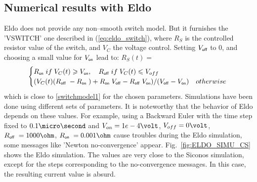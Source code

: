 \subsection{Numerical results with {\sc Eldo}}
{\sc Eldo} does not provide any non--smooth switch model. But it furnishes the 'VSWITCH' one described in
(\ref{eq:eldo_switch}), where  $R_S$ is the controlled resistor value of the switch, and $V_{C}$ the voltage
control. Setting $V_{\off}$ to $0$, and choosing a small value for $V_{\on}$ lead to: $R_S(t)=$
 \begin{equation}
    \label{eq:eldo_switch}
\begin{cases}R_\on\;  \mbox{if}\;V_{C}(t) \geq V_{\on},  \quad R_\off\;   \mbox{if}\;V_{C}(t) \leq
    V_{off} \\ (V_{C}(t)(R_\off\;-R_\on\;)+ R_\on\; V_{\off}- 
    R_\off\;V_{\on})/(V_{\off}-V_{\on})& \mbox{otherwise}\; \end{cases}
  \end{equation}
  which is close to \eqref{switchmodel1} for the chosen parameters. Simulations have been done using
  different sets of parameters. It is noteworthy that the
behavior of {\sc Eldo} depends on these values. For example, using a Backward Euler with the time step fixed to $0.1 \micro \second$ and $V_{on}=1e-4\volt$, $V_{off}=0 \volt$,
$R_\off\; = 1000 \ohm$, $R_\on\;=0.001\ohm$ cause troubles during the {\sc Eldo}
simulation, some messages like 'Newton no-convergence' appear. Fig.~\ref{fig:ELDO_SIMU_CS}
  shows the {\sc Eldo} simulation. The values are very close to the {\sc Siconos} simulation, except for the steps corresponding to the
  no-convergence messages. In this case, the resulting current value is absurd.
